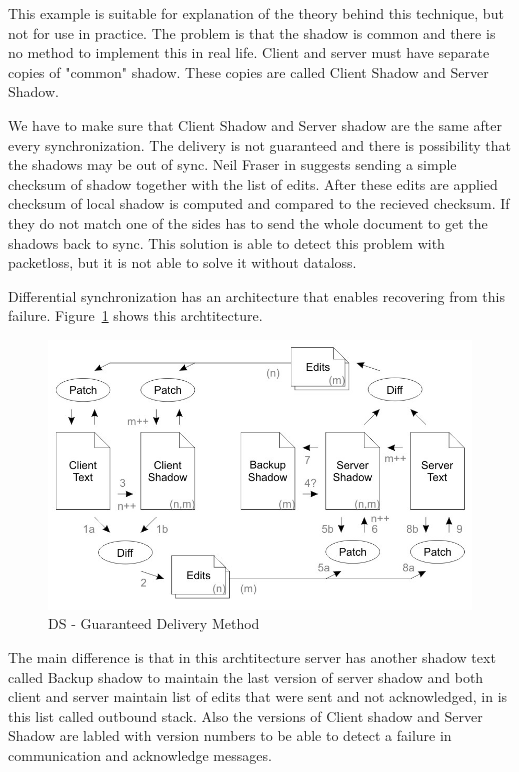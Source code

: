 \documentclass[12pt,oneside]{fithesis2}
\begin{document}
\par This example is suitable for explanation of the theory behind this technique, but not for use in practice. The problem is that the shadow is common and there is no method to implement this in real life. Client and server must have separate copies of "common" shadow. These copies are called Client Shadow and Server Shadow.
\par We have to make sure that Client Shadow and Server shadow are the same after every synchronization. The delivery is not guaranteed and there is possibility that the shadows may be out of sync. Neil Fraser in \cite{Fraser} suggests sending a simple checksum of shadow together with the list of edits. After these edits are applied checksum of local shadow is computed and compared to the recieved checksum. If they do not match one of the sides has to send the whole document to get the shadows back to sync. This solution is able to detect this problem with packetloss, but it is not able to solve it without dataloss.
\par Differential synchronization has an architecture that enables recovering from this failure. Figure~\ref{fig:ds2} shows this archtitecture.
\begin{figure}[H]
\caption{DS - Guaranteed Delivery Method \cite{Fraser}}
\label{fig:ds2}
\centering
\vspace{5mm}
\includegraphics[scale=0.45]{diff2}
\end{figure}
\par The main difference is that in this archtitecture server has another shadow text called Backup shadow to maintain the last version of server shadow and both client and server maintain list of edits that were sent and not acknowledged, in \cite{Fraser} is this list called outbound stack. Also the versions of Client shadow and Server Shadow are labled with version numbers to be able to detect a failure in communication and acknowledge messages.
\end{document}
